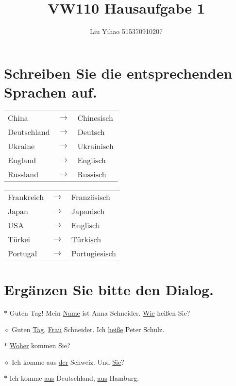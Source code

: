 \documentclass{article}
\title{VW110 Hausaufgabe 1}
\author{Liu Yihao 515370910207}
\date{}
\begin{document}
\maketitle

\section{Schreiben Sie die entsprechenden Sprachen auf.}

\begin{minipage}{0.48\linewidth}
\begin{tabular}{lcl}
China & $\longrightarrow$ & Chinesisch \\
Deutschland & $\longrightarrow$ & Deutsch \\
Ukraine & $\longrightarrow$ & Ukrainisch \\
England & $\longrightarrow$ & Englisch \\
Russland & $\longrightarrow$ & Russisch \\
\end{tabular}

\end{minipage}
\hfill
\begin{minipage}{0.48\linewidth}
\begin{tabular}{lcl}
Frankreich & $\longrightarrow$ & Französisch \\
Japan & $\longrightarrow$ & Japanisch \\
USA & $\longrightarrow$ & Englisch \\
Türkei & $\longrightarrow$ & Türkisch \\
Portugal & $\longrightarrow$ & Portugiesisch \\
\end{tabular}
\end{minipage}

\section{Ergänzen Sie bitte den Dialog.}

$\ast$ Guten Tag! Mein \uline{Name} ist Anna Schneider. \uline{Wie} heißen Sie?

$\diamond$ Guten \uline{Tag}, \uline{Frau} Schneider. Ich \uline{heiße} Peter Schulz.

$\ast$ \uline{Woher} kommen Sie?

$\diamond$ Ich komme aus \uline{der} Schweiz. Und \uline{Sie}?

$\ast$ Ich komme \uline{aus} Deutschland, \uline{aus} Hamburg.
\end{document}
